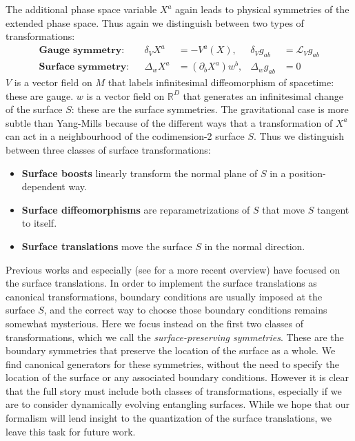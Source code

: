 \documentclass[a4paper,11pt]{article}
\def\pa{\partial}
\begin{document}
The additional phase space variable $X^a$ again leads to physical symmetries of the extended phase space.
Thus again we distinguish between two types of transformations:
\begin{align}
\textbf{Gauge symmetry:}& &\delta_V X^a &= -V^a(X), & \delta_V g_{ab} &= \mathcal{L}_V g_{ab} \\
\textbf{Surface symmetry:}& &\Delta_w X^a &= (\pa_b X^a) w^b , & \Delta_w g_{ab} &= 0
\end{align}
$V$ is a vector field on $M$ that labels infinitesimal diffeomorphism of spacetime: these are gauge. 
$w$ is a vector field on $\mathbb{R}^D$ that generates an infinitesimal change of the surface $S$: these are the surface symmetries.
The gravitational case is more subtle than Yang-Mills because of the different ways that a transformation of $X^a$ can act in a neighbourhood of the codimension-2 surface $S$.
Thus we distinguish between three classes of surface transformations:
\begin{itemize}
\item \textbf{Surface boosts} linearly transform the normal plane of $S$ in a position-dependent way.
\item \textbf{Surface diffeomorphisms} are reparametrizations of $S$ that move $S$ tangent to itself.
\item \textbf{Surface translations} move the surface $S$ in the normal direction.
\end{itemize}
Previous works \cite{Balachandran1994,Balachandran1995} and especially \cite{Carlip1994,Carlip1998,Carlip1999} (see \cite{Carlip2011} for a more recent overview) have focused on the surface translations.
In order to implement the surface translations as canonical transformations, boundary conditions are usually imposed at the surface $S$, and the correct way to choose those boundary conditions remains somewhat mysterious.
Here we focus instead on the first two classes of transformations, which we call the \emph{surface-preserving symmetries}. These are the boundary symmetries that preserve the location of the surface as a whole.  
We find canonical generators  for these symmetries, without the need to specify the location of the surface or any associated boundary conditions.
However it is clear that the full story must include both classes of transformations, especially if we are to consider dynamically evolving entangling surfaces.
While we hope that our formalism will lend insight to the quantization of the surface translations, we leave this task for future work.
\end{document}
